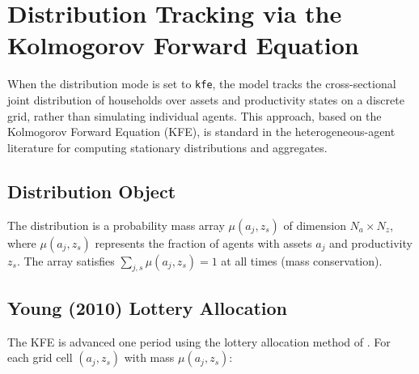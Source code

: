 \documentclass[12pt]{article}
\begin{document}
\section{Distribution Tracking via the Kolmogorov Forward Equation}\label{sec:distribution}

When the distribution mode is set to \texttt{kfe}, the model tracks the cross-sectional joint distribution of households over assets and productivity states on a discrete grid, rather than simulating individual agents. This approach, based on the Kolmogorov Forward Equation (KFE), is standard in the heterogeneous-agent literature for computing stationary distributions and aggregates.

\subsection{Distribution Object}

The distribution is a probability mass array $\mu(a_j, z_s)$ of dimension $N_a \times N_z$, where $\mu(a_j, z_s)$ represents the fraction of agents with assets $a_j$ and productivity $z_s$. The array satisfies $\sum_{j,s} \mu(a_j, z_s) = 1$ at all times (mass conservation).

\subsection{Young (2010) Lottery Allocation}\label{sec:young_lottery}

The KFE is advanced one period using the lottery allocation method of \citet{young2010}. For each grid cell $(a_j, z_s)$ with mass $\mu(a_j, z_s)$:
\end{document}
